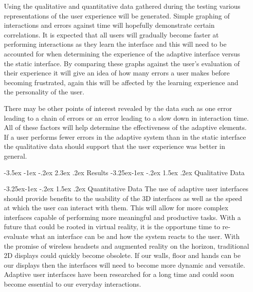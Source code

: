 \documentclass[12pt]{article}
\makeatletter
\renewcommand{\section}{\@startsection {section}{1}{\z@}%
             {-3.5ex \@plus -1ex \@minus -.2ex}%
             {2.3ex \@plus .2ex}%
             {\normalfont\Large\scshape\bfseries}}
\renewcommand{\subsection}{\@startsection{subsection}{2}{\z@}%
             {-3.25ex\@plus -1ex \@minus -.2ex}%
             {1.5ex \@plus .2ex}%
             {\normalfont\large\scshape\bfseries}}
\makeatother
\begin{document}
Using the qualitative and quantitative data gathered during the testing various representations of the user experience will be generated. Simple graphing of interactions and errors against time will hopefully demonstrate certain correlations. It is expected that all users will gradually become faster at performing interactions as they learn the interface and this will need to be accounted for when determining the experience of the adaptive interface versus the static interface. By comparing these graphs against the user's evaluation of their experience it will give an idea of how many errors a user makes before becoming frustrated, again this will be affected by the learning experience and the personality of the user. 

There may be other points of interest revealed by the data such as one error leading to a chain of errors or an error leading to a slow down in interaction time. All of these factors will help determine the effectiveness of the adaptive elements. If a user performs fewer errors in the adaptive system than in the static interface the qualitative data should support that the user experience was better in general.

\section{Results}
\subsection{Qualitative Data}


\subsection{Quantitative Data}
The use of adaptive user interfaces should provide benefits to the usability of the 3D interfaces as well as the speed at which the user can interact with them. This will allow for more complex interfaces capable of performing more meaningful and productive tasks. With a future that could be rooted in virtual reality, it is the opportune time to re-evaluate what an interface can be and how the system reacts to the user. With the promise of wireless headsets and augmented reality on the horizon, traditional 2D displays could quickly become obsolete. If our walls, floor and hands can be our displays then the interfaces will need to become more dynamic and versatile. Adaptive user interfaces have been researched for a long time and could soon become essential to our everyday interactions.
\end{document}
